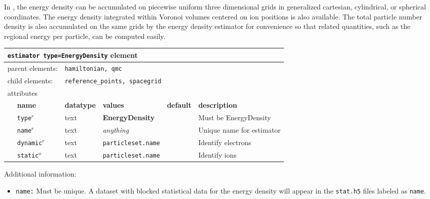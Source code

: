 In \qmcpack, the energy density can be accumulated on piecewise uniform three dimensional grids in generalized cartesian, cylindrical, or spherical coordinates.  The energy density integrated within Voronoi volumes centered on ion positions is also available.  The total particle number density is also accumulated on the same grids by the energy density estimator for convenience so that related quantities, such as the regional energy per particle, can be computed easily.


\FloatBarrier
\begin{table}[h]
\begin{center}
\begin{tabularx}{\textwidth}{l l l l l l }
\hline
\multicolumn{6}{l}{\texttt{estimator type=EnergyDensity} element} \\
\hline
\multicolumn{2}{l}{parent elements:} & \multicolumn{4}{l}{\texttt{hamiltonian, qmc}}\\
\multicolumn{2}{l}{child  elements:} & \multicolumn{4}{l}{\texttt{reference\_points, spacegrid}}\\
\multicolumn{2}{l}{attributes}  & \multicolumn{4}{l}{}\\
   &   \bfseries name     & \bfseries datatype & \bfseries values & \bfseries default   & \bfseries description \\
   & \texttt{type}$^r$    &  text              & \textbf{EnergyDensity}    &                  & Must be EnergyDensity     \\
   & \texttt{name}$^r$    &  text              & \textit{anything}         &                  & Unique name for estimator \\
   & \texttt{dynamic}$^r$ &  text              & \texttt{particleset.name} &                  & Identify electrons \\
   & \texttt{static}$^o$  &  text              & \texttt{particleset.name} &                  & Identify ions  \\
   
  \hline
\end{tabularx}
\end{center}
\end{table}
\FloatBarrier

Additional information:
\begin{itemize}
  \item{\texttt{name:}  Must be unique.  A dataset with blocked statistical data for the energy density will appear in the \texttt{stat.h5} files labeled as \texttt{name}.}
\end{itemize}


